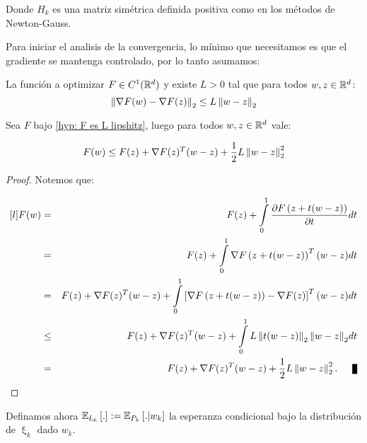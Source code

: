 Donde $H_k$ es una matriz sim\'etrica definida positiva como en los m\'etodos de Newton-Gauss. 

\smallskip

Para iniciar el analisis de la convergencia, lo m\'inimo que necesitamos es que el gradiente se mantenga controlado, por lo tanto asumamos:

\begin{hyp} [$F$ es $l$-Lipshitz]
	\label{hyp: F es L lipshitz}
	La funci\'on a optimizar $F \in C^1({\mathbb{R}}^d)$ y existe $L >0$ tal que para todos $w,z \in {\mathbb{R}}^d$:
	\begin{equation*}
		\left\lVert\nabla F(w) - \nabla F(z)\right\rVert_2 \leq L \left\lVert w-z\right\rVert_2
	\end{equation*} 
\end{hyp}

\begin{remark}
	\label{obs: F es l lipshitz}
	Sea $F$ bajo \ref{hyp: F es L lipshitz}, luego para todos $w,z\in {\mathbb{R}}^d$ vale:
	
	\begin{equation*}
		F(w) \leq F(z) + \nabla F(z)^T(w-z) + \frac{1}{2}L \left\lVert w-z\right\rVert^2_2
	\end{equation*}

\end{remark}

\begin{proof}
	Notemos que:
	
	\begin{equation*}
	\begin{aligned}[l]
	F(w) & = & F(z) + \int\limits_{0}^{1} {\dfrac{\partial F \left(z + t(w-z)\right)}{\partial t}}dt \\
	& = & F(z) + \int\limits_{0}^{1} {\nabla F \left(z + t(w-z)\right)^T (w-z)}dt \\
	& = & F(z) + \nabla F(z)^T(w-z) + \int\limits_{0}^{1} { \left[\nabla F \left(z + t(w-z)\right) - \nabla F(z)\right]^T (w-z)}dt \\
	& \leq & F(z) + \nabla F(z)^T(w-z) + \int\limits_{0}^{1} { L \norm{t(w-z)}_2 \norm{w-z}_2}dt \\
	& = & F(z) + \nabla F(z)^T(w-z) + \frac{1}{2}L \norm{w-z}^2_2. \qed
	\end{aligned}
	\end{equation*}
	
\end{proof}

Definamos ahora $\mathbb{E}_{\upxi_k} \left[.\right] := \mathbb{E}_{P_k}\left[. \vert w_k\right]$ la esperanza condicional bajo la distribuci\'on de $\upxi_k$ dado $w_k$.

